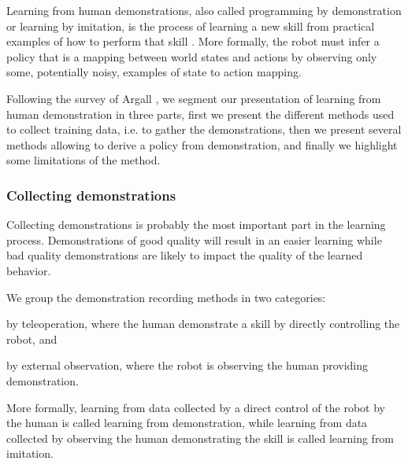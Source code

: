 Learning from human demonstrations, also called programming by demonstration or learning by imitation, is the process of learning a new skill from practical examples of how to perform that skill \cite{schaal1999imitation,calinon2008robot,argall09survey,lopes10imitationchapter}. More formally, the robot must infer a policy that is a mapping between world states and actions by observing only some, potentially noisy, examples of state to action mapping. %

Following the survey of Argall \cite{argall09survey}, we segment our presentation of learning from human demonstration in three parts, first we present the different methods used to collect training data, i.e. to gather the demonstrations, then we present several methods allowing to derive a policy from demonstration, and finally we highlight some limitations of the method.


\subsubsection*{Collecting demonstrations}

Collecting demonstrations is probably the most important part in the learning process. Demonstrations of good quality will result in an easier learning while bad quality demonstrations are likely to impact the quality of the learned behavior.

We group the demonstration recording methods in two categories: \begin{inparaenum}[(1)] \item by teleoperation, where the human demonstrate a skill by directly controlling the robot, and \item by external observation, where the robot is observing the human providing demonstration. \end{inparaenum} More formally, learning from data collected by a direct control of the robot by the human is called learning from demonstration, while learning from data collected by observing the human demonstrating the skill is called learning from imitation. 


